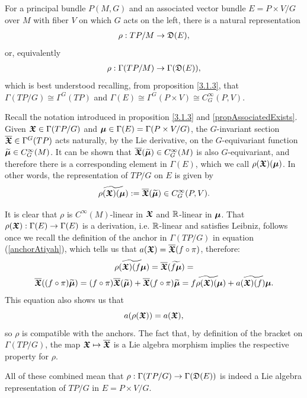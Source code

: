 \begin{example}
For a principal bundle $P(M, G)$ and an associated vector bundle $E = P \times V / G$ over $M$ with fiber $V$ on which $G$ acts on the left, there is a natural representation
\begin{align*}
    \rho: TP/M \to \mathfrak{D}(E),
\end{align*}
or, equivalently
\begin{align*}
    \rho: \Gamma(TP/M) \to \Gamma(\mathfrak{D}(E)),
\end{align*}
which is best understood recalling, from proposition \ref{3.1.3}, that $\Gamma(TP/G) \cong \Gamma^G(TP)$ and $\Gamma(E) \cong \Gamma^G(P \times V) \cong C^\infty_G(P, V)$.

Recall the notation introduced in proposition \ref{3.1.3} and \ref{propAssociatedExists}. Given $\bm{\mathfrak{X}} \in \Gamma(TP/G)$ and $\bm{\mu} \in \Gamma(E) = \Gamma(P \times V/G)$, the $G$-invariant section $\overline{\bm{\mathfrak{X}}} \in \Gamma^G(TP)$ acts naturally, by the Lie derivative, on the $G$-equivariant function $\widetilde{\bm{\mu}} \in C^\infty_G(M)$. It can be shown that $\overline{\bm{\mathfrak{X}}}(\widetilde{\bm{\mu}}) \in C^\infty_G(M)$ is also $G$-equivariant, and therefore there is a corresponding element in $\Gamma(E)$, which we call $\rho(\bm{\mathfrak{X}})(\bm{\mu})$. In other words, the representation of $TP/G$ on $E$ is given by
\begin{equation} \label{defnReprPpalAss}
    \widetilde{\rho(\bm{\mathfrak{X}})(\bm{\mu})} := \overline{\bm{\mathfrak{X}}}(\widetilde{\bm{\mu}}) \in C^\infty_G(P, V).
\end{equation}

It is clear that $\rho$ is $C^\infty(M)$-linear in $\bm{\mathfrak{X}}$ and $\mathbb{R}$-linear in $\bm{\mu}$. That $\rho(\bm{\mathfrak{X}}): \Gamma(E) \to \Gamma(E)$ is a derivation, i.e. $\mathbb{R}$-linear and satisfies Leibniz, follows once we recall the definition of the anchor in $\Gamma(TP/G)$ in equation (\ref{anchorAtiyah}), which tells us that $a(\bm{\mathfrak{X}}) = \overline{\bm{\mathfrak{X}}}(f \circ \pi)$, therefore:
\begin{multline*}
    \widetilde{\rho(\bm{\mathfrak{X}})(f \bm{\mu})} = 
    \overline{\bm{\mathfrak{X}}}(\widetilde{f \bm{\mu}}) = \\
    \overline{\bm{\mathfrak{X}}}((f \circ \pi) \widetilde{ \bm{\mu}}) = 
    (f \circ \pi) \overline{\bm{\mathfrak{X}}}(\widetilde{\bm{\mu}}) + \overline{\bm{\mathfrak{X}}}(f \circ \pi) \widetilde{\bm{\mu}} = \widetilde{f \rho(\bm{\mathfrak{X}})(\bm{\mu})} + \widetilde{a(\bm{\mathfrak{X}})(f) \bm{\mu}}.
\end{multline*}
This equation also shows us that \[a(\rho(\bm{\mathfrak{X}})) = a(\bm{\mathfrak{X}}),\] so $\rho$ is compatible with the anchors. The fact that, by definition of the bracket on $\Gamma(TP/G)$, the map $\bm{\mathfrak{X}} \mapsto \overline{\bm{\mathfrak{X}}}$ is a Lie algebra morphism implies the respective property for $\rho$. 

All of these combined mean that $\rho: \Gamma(TP/G) \to \Gamma(\mathfrak{D}(E))$ is indeed a Lie algebra representation of $TP/G$ in $E = P \times V/G$.
\end{example}

